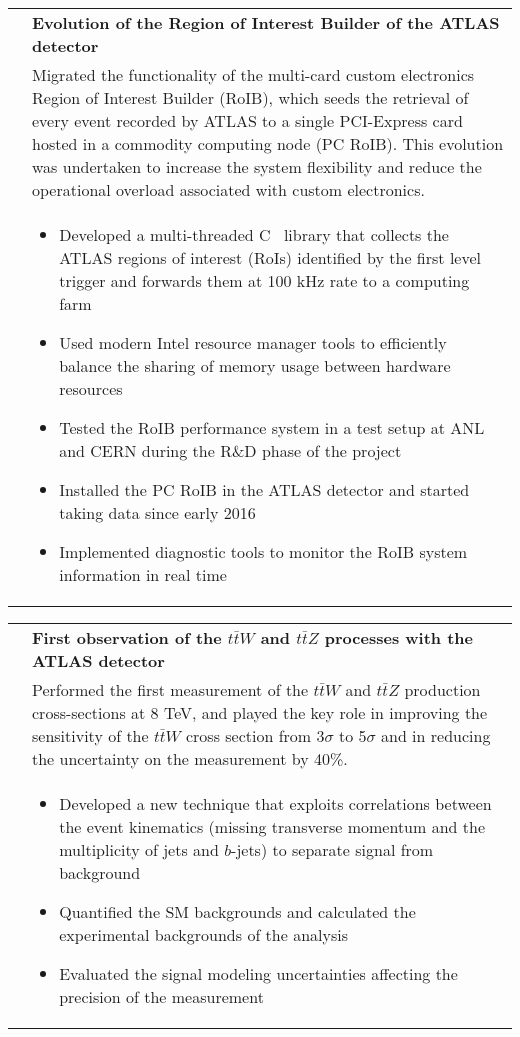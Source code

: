 \documentclass[a4paper,10pt]{article}
\newcommand{\CC}{C\nolinebreak\hspace{-.05em}\raisebox{.4ex}{\tiny\bf +}\nolinebreak\hspace{-.10em}\raisebox{.4ex}{\tiny\bf +}}
\begin{document}
\begin{tabularx}{\textwidth}{>{\centering\arraybackslash}X p{} }
  {\sl 2014--2016} & {\bf Evolution of the Region of Interest Builder of the ATLAS detector}  \\
  & Migrated the functionality of the multi-card custom electronics
  Region of Interest Builder (RoIB), which seeds the retrieval of every event recorded by ATLAS to a single PCI-Express card
  hosted in a commodity computing node (PC RoIB). This evolution was undertaken to increase the system flexibility
  and reduce the operational overload associated with custom electronics. \\
  & \begin{itemize}
  \item Developed a multi-threaded \CC~ library that collects the ATLAS regions of interest (RoIs) identified by the
    first level trigger and forwards them at 100 kHz rate to a computing farm
  \item Used modern Intel resource manager tools to efficiently balance the sharing of memory usage between hardware resources
  \item Tested the RoIB performance system in a test setup at ANL and CERN during the R\&D phase of the project
  \item Installed the PC RoIB in the ATLAS detector and started taking data since early 2016
  \item Implemented diagnostic tools to monitor the RoIB system information in real time
  \end{itemize}\\
\end{tabularx}
\begin{tabularx}{\textwidth}{>{\centering\arraybackslash}X p{} }
 {\sl 2014--2015} & {\bf First observation of the $t\bar{t}W$ and $t\bar{t}Z$ processes with the ATLAS detector} \\
  & Performed the first measurement of the $t\bar{t}W$ and $t\bar{t}Z$ production cross-sections at 8 TeV, and played the key role in
  improving the sensitivity of the $t\bar{t}W$ cross section from 3$\sigma$ to 5$\sigma$ and in reducing the uncertainty on
  the measurement by 40\%.\\
  & \begin{itemize}
  \item Developed a new technique that exploits correlations between the event kinematics (missing transverse momentum and
    the multiplicity of jets and $b$-jets) to separate signal from background
  \item Quantified the SM backgrounds and calculated the experimental backgrounds of the analysis
  \item Evaluated the signal modeling uncertainties affecting the precision of the measurement
  \end{itemize}\\
\end{tabularx}
\end{document}
